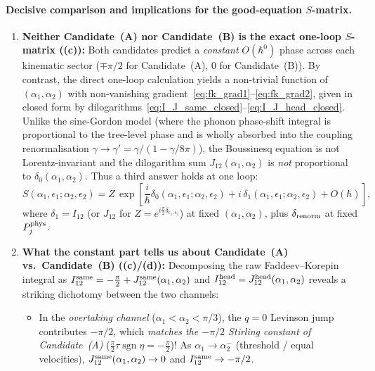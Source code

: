 \documentclass[11pt,a4paper]{article}
\newcommand{\Lc}{\textsf{\textbf{(c)}}}
\newcommand{\Ld}{\textsf{\textbf{(d)}}}
\theoremstyle{remark}
\begin{document}
\paragraph{Decisive comparison and implications for the good-equation $S$-matrix.}
\begin{enumerate}
\item \textbf{Neither Candidate~(A) nor Candidate~(B) is the exact one-loop $S$-matrix (\Lc):}
Both candidates predict a \emph{constant} $O(\hbar^0)$ phase across each kinematic sector ($\mp\pi/2$ for Candidate~(A), $0$ for Candidate~(B)). By contrast, the direct one-loop calculation yields a non-trivial function of $(\alpha_1,\alpha_2)$ with non-vanishing gradient~\eqref{eq:fk_grad1}--\eqref{eq:fk_grad2}, given in closed form by dilogarithms~\eqref{eq:I_J_same_closed}--\eqref{eq:I_J_head_closed}. Unlike the sine-Gordon model \cite{FK78} (where the phonon phase-shift integral is proportional to the tree-level phase and is wholly absorbed into the coupling renormalisation $\gamma\to\gamma'=\gamma/(1-\gamma/8\pi)$), the Boussinesq equation is not Lorentz-invariant and the dilogarithm sum $J_{12}(\alpha_1,\alpha_2)$ is \emph{not} proportional to $\delta_0(\alpha_1,\alpha_2)$. Thus a third answer holds at one loop:
\begin{equation}\label{eq:third_answer}
S(\alpha_1,\epsilon_1;\alpha_2,\epsilon_2)=Z\,\exp\!\left[\frac{i}{\hbar}\delta_0(\alpha_1,\epsilon_1;\alpha_2,\epsilon_2)+i\,\delta_1(\alpha_1,\epsilon_1;\alpha_2,\epsilon_2)+O(\hbar)\right],
\end{equation}
where $\delta_1=I_{12}$ (or $J_{12}$ for $Z=e^{i\frac{\pi}{2}\delta_{\epsilon_1,\epsilon_2}}$) at fixed $(\alpha_1,\alpha_2)$, plus $\delta_{\rm renorm}$ at fixed $P_j^{\rm phys}$.
\item \textbf{What the constant part tells us about Candidate~(A) vs.\ Candidate~(B) (\Lc/\Ld):}
Decomposing the raw Faddeev--Korepin integral as $I_{12}^{\rm same}=-\frac{\pi}{2}+J_{12}^{\rm same}(\alpha_1,\alpha_2)$ and $I_{12}^{\rm head}=J_{12}^{\rm head}(\alpha_1,\alpha_2)$ reveals a striking dichotomy between the two channels:
\begin{itemize}
\item In the \emph{overtaking channel} ($\alpha_1<\alpha_2<\pi/3$), the $q=0$ Levinson jump contributes $-\pi/2$, which \emph{matches the $-\pi/2$ Stirling constant of Candidate~(A)} ($\frac{\pi}{2}\tau\operatorname{sgn}\eta=-\frac{\pi}{2}$)! As $\alpha_1\to\alpha_2^-$ (threshold / equal velocities), $J_{12}^{\rm same}(\alpha_1,\alpha_2)\to 0$ and $I_{12}^{\rm same}\to -\pi/2$.

\end{itemize}
\end{enumerate}
\end{document}
